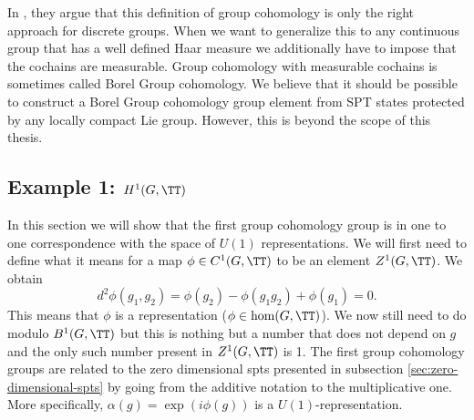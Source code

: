 \begin{remark}
	In \cite{Chen_2013}, they argue that this definition of group cohomology is only the right approach for discrete groups. When we want to generalize this to any continuous group that has a well defined Haar measure we additionally have to impose that the cochains are measurable. Group cohomology with measurable cochains is sometimes called Borel Group cohomology. We believe that it should be possible to construct a Borel Group cohomology group element from SPT states protected by any locally compact Lie group. However, this is beyond the scope of this thesis.
\end{remark}
\subsection{Example 1: $H^1(G,\TT)$}\label{sec:example-1-h1gtt}
In this section we will show that the first group cohomology group is in one to one correspondence with the space of $U(1)$ representations. We will first need to define what it means for a map $\phi\in C^1(G, \TT)$ to be an element $Z^1(G,\TT)$. We obtain
\begin{equation}
d^2\phi(g_1,g_2)=\phi(g_2)-\phi(g_1g_2)+\phi(g_1)=0.
\end{equation}
This means that $\phi$ is a representation ($\phi\in\hom(G,\TT)$). We now still need to do modulo $B^1(G,\TT)$ but this is nothing but a number that does not depend on $g$ and the only such number present in $Z^1(G,\TT)$ is 1. The first group cohomology groups are related to the zero dimensional spts presented in subsection \ref{sec:zero-dimensional-spts} by going from the additive notation to the multiplicative one. More specifically, $\alpha(g)=\exp(i\phi(g))$ is a $U(1)$-representation.
